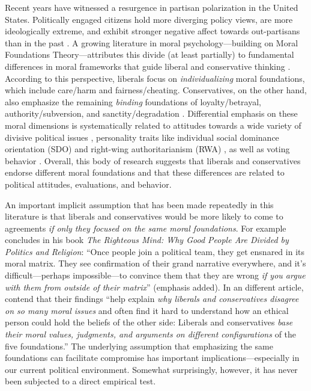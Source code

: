\documentclass[12pt,]{article}
\begin{document}
\noindent \doublespacing Recent years have witnessed a resurgence in partisan polarization in the
United States. Politically engaged citizens hold more diverging policy
views, are more ideologically extreme, and exhibit stronger negative
affect towards out-partisans than in the past
\citep{hetherington2001resurgent, abramowitz2008polarization, iyengar2012affect, mason2014disrespectfully, huddy2015expressive, iyengar2015fear}.
A growing literature in moral psychology---building on Moral Foundations
Theory---attributes this divide (at least partially) to fundamental
differences in moral frameworks that guide liberal and conservative
thinking \citep[c.f.,][]{haidt2012righteous}. According to this
perspective, liberals focus on \emph{individualizing} moral foundations,
which include care/harm and fairness/cheating. Conservatives, on the
other hand, also emphasize the remaining \emph{binding} foundations of
loyalty/betrayal, authority/subversion, and sanctity/degradation
\citep{haidt2007morality, graham2009liberals}. Differential emphasis on
these moral dimensions is systematically related to attitudes towards a
wide variety of divisive political issues
\citep[e.g.][]{koleva2012tracing, kertzer2014moral, low2015moral},
personality traits like individual social dominance orientation (SDO)
and right-wing authoritarianism (RWA) \citep{federico2013mapping}, as
well as voting behavior \citep{franks2015using}. Overall, this body of
research suggests that liberals and conservatives endorse different
moral foundations and that these differences are related to political
attitudes, evaluations, and behavior.

An important implicit assumption that has been made repeatedly in this
literature is that liberals and conservatives would be more likely to
come to agreements \emph{if only they focused on the same moral
foundations}. For example \citet[365]{haidt2012righteous} concludes in
his book \emph{The Righteous Mind: Why Good People Are Divided by
Politics and Religion}: ``Once people join a political team, they get
ensnared in its moral matrix. They see confirmation of their grand
narrative everywhere, and it's difficult---perhaps impossible---to
convince them that they are wrong \emph{if you argue with them from
outside of their matrix}'' (emphasis added). In an different article,
\citet[1040]{graham2009liberals} contend that their findings ``help
explain \emph{why liberals and conservatives disagree on so many moral
issues} and often find it hard to understand how an ethical person could
hold the beliefs of the other side: Liberals and conservatives
\emph{base their moral values, judgments, and arguments on different
configurations} of the five foundations.'' The underlying assumption
that emphasizing the same foundations can facilitate compromise has
important implications---especially in our current political
environment. Somewhat surprisingly, however, it has never been subjected
to a direct empirical test.
\end{document}

